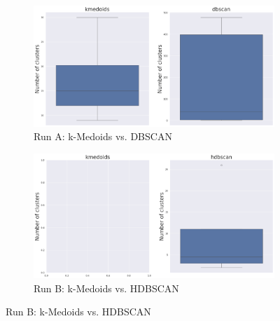 \documentclass[10pt,oneside]{report}
\begin{document}
\begin{figure}[H]
    \centering
    \begin{subfigure}[b]{\textwidth}
        \centering
        \includegraphics[width=\textwidth]{./images/mpnet_kmedoidsvsdbscan_whisker.png}
        \caption{Run A: k-Medoids vs. DBSCAN}\label{fig:mpnet_h2h_runa}
    \end{subfigure}
    \hfill
    \begin{subfigure}[b]{\textwidth}
        \centering
        \includegraphics[width=\textwidth]{./images/mpnet_kmedoidsvshdbscan_whisker.png}
        \caption{Run B: k-Medoids vs. HDBSCAN}\label{fig:mpnet_h2h_runb}
    \end{subfigure}
\end{figure}
\end{document}
